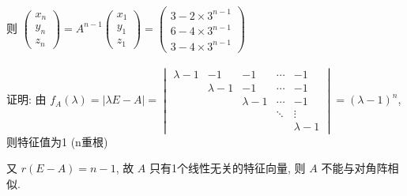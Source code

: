 		 则 \( \begin{pmatrix}
			 x_{n} \\
			 y_{n} \\
			 z_{n}
		 \end{pmatrix} = A^{n-1}\begin{pmatrix}
			 x_{1} \\
			 y_{1} \\
			 z_{1}
		 \end{pmatrix} = \begin{pmatrix}
			 3-2\times3^{n-1} \\
			 6-4\times3^{n-1} \\
			 3-4\times3^{n-1}
		 \end{pmatrix} \)


	 \paragraph{} %
		 证明: 由 \( f_{A}(\lambda) = |\lambda E - A| = \begin{vmatrix}
			 \lambda-1 & -1        & -1        & \cdots & -1        \\
			           & \lambda-1 & -1        & \cdots & -1        \\
			           &           & \lambda-1 & \cdots & -1        \\
			           &           &           & \ddots & \vdots    \\
			           &           &           &        & \lambda-1
		 \end{vmatrix} = (\lambda-1)^{n} \), 则特征值为1 (n重根)

		 又 \( r(E-A) = n-1 \), 故 \( A \) 只有1个线性无关的特征向量, 则 \( A \) 不能与对角阵相似.


